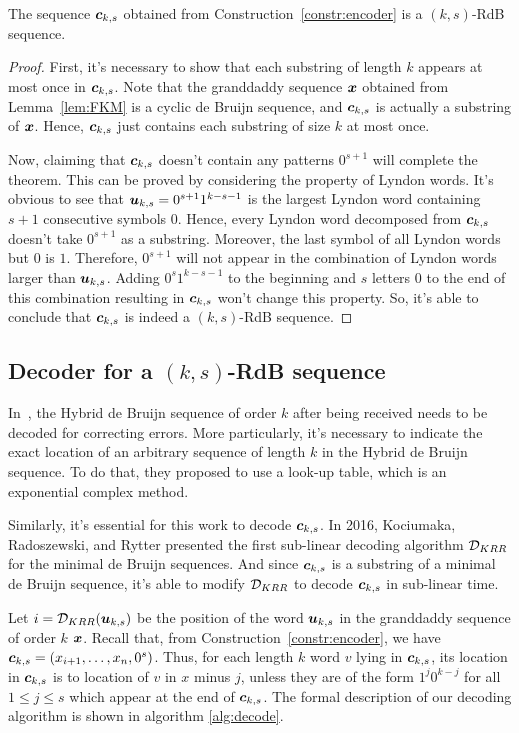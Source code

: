\begin{theorem}\label{theo:validity}
    The sequence ${\boldsymbol c}_{k,s}$ obtained from Construction~\ref{constr:encoder} is a $(k,s)$-RdB sequence.
\end{theorem}
\begin{proof}
    First, it's necessary to show that each substring of length $k$ appears at most once in ${\boldsymbol c}_{k,s}$. Note that the granddaddy sequence ${\boldsymbol x}$ obtained from Lemma~\ref{lem:FKM} is a cyclic de Bruijn sequence, and ${\boldsymbol c}_{k,s}$ is actually a substring of ${\boldsymbol x}$. Hence, ${\boldsymbol c}_{k,s}$ just contains each substring of size $k$ at most once.
    
    Now, claiming that ${\boldsymbol c}_{k,s}$ doesn't contain any patterns $0^{s+1}$ will complete the theorem. This can be proved by considering the property of Lyndon words. It's obvious to see that ${\boldsymbol u}_{k,s}=0^{s+1}1^{k-s-1}$ is the largest Lyndon word containing $s+1$ consecutive symbols $0$. Hence, every Lyndon word decomposed from ${\boldsymbol c}_{k,s}$ doesn't take $0^{s+1}$ as a substring. Moreover, the last symbol of all Lyndon words but $0$ is $1$. Therefore, $0^{s+1}$ will not appear in the combination of Lyndon words larger than ${\boldsymbol u}_{k,s}$. Adding $0^{s}1^{k-s-1}$ to the beginning and $s$ letters $0$ to the end of this combination resulting in ${\boldsymbol c}_{k,s}$ won't change this property. So, it's able to conclude that ${\boldsymbol c}_{k,s}$ is indeed a $(k,s)$-RdB sequence.
\end{proof}

\subsection{Decoder for a \texorpdfstring{$(k,s)$}{(k,s)}-RdB sequence}
In~\cite{zhang2021timing}, the Hybrid de Bruijn sequence of order $k$ after being received needs to be decoded for correcting errors. More particularly, it's necessary to indicate the exact location of an arbitrary sequence of length $k$ in the Hybrid de Bruijn sequence. To do that, they proposed to use a look-up table, which is an exponential complex method.

Similarly, it's essential for this work to decode ${\boldsymbol c}_{k,s}$. In 2016, Kociumaka, Radoszewski, and Rytter presented the first sub-linear decoding algorithm ${\cal D}_{KRR}$ for the minimal de Bruijn sequences. And since ${\boldsymbol c}_{k,s}$ is a substring of a minimal de Bruijn sequence, it's able to modify ${\cal D}_{KRR}$ to decode ${\boldsymbol c}_{k,s}$ in sub-linear time. 

Let $i={\cal D}_{KRR}({\boldsymbol u}_{k,s})$ be the position of the word ${\boldsymbol u}_{k,s}$ in the granddaddy sequence of order $k$ ${\boldsymbol x}$. Recall that, from Construction~\ref{constr:encoder}, we have ${\boldsymbol c}_{k,s}=(x_{i+1},\ldots,x_{n},0^{s})$. Thus, for each length $k$ word $v$ lying in ${\boldsymbol c}_{k,s}$, its location in ${\boldsymbol c}_{k,s}$ is to location of $v$ in $x$ minus $j$, unless they are of the form $1^{j}0^{k-j}$ for all $1\leq j\leq s$ which appear at the end of ${\boldsymbol c}_{k,s}$. The formal description of our decoding algorithm is shown in algorithm \ref{alg:decode}.

